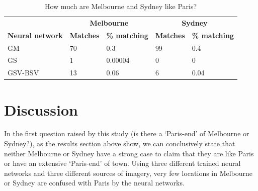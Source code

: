 \documentclass[sageh,times]{sagej}
\begin{document}









\begin{table}[!htbp]
\caption{How much are Melbourne and Sydney like Paris? \label{tab:melbournesydneyparis}}     
\begin{tabular}{ l  l l l  l}
 \hline    &  \multicolumn{2}{c}{\textbf{Melbourne}} & \multicolumn{2}{c}{\textbf{Sydney}}  \\  
\textbf{Neural network} & \textbf{Matches} & \textbf{\% matching}  & \textbf{Matches} & \textbf{\% matching}\\ \hline
GM & 70 & 0.3 & 99 & 0.4 \\ 
GS & 1 & 0.00004 & 0 & 0 \\ 
GSV-BSV & 13 & 0.06 & 6 & 0.04 \\ \hline

\end{tabular}
\end{table}









\section{Discussion}\label{sec:discussion}


In the first question raised by this study (is there a `Paris-end' of Melbourne or Sydney?), as the results section above show, we can conclusively state that neither Melbourne or Sydney have a strong case to claim that they are like Paris or have an extensive `Paris-end' of town. Using three different trained neural networks and three different sources of imagery, very few locations in Melbourne or Sydney are confused with Paris by the neural networks. 
\end{document}
